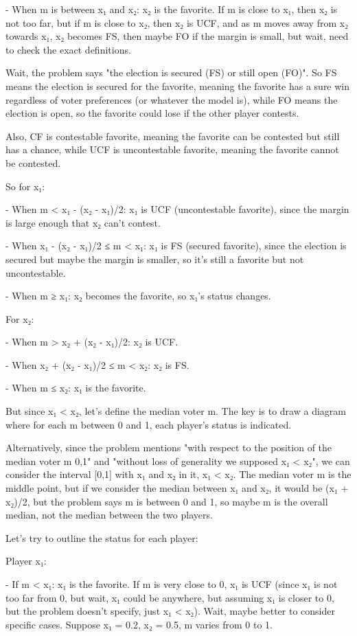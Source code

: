 - When m is between x₁ and x₂: x₂ is the favorite. If m is close to x₁, then x₂ is not too far, but if m is close to x₂, then x₂ is UCF, and as m moves away from x₂ towards x₁, x₂ becomes FS, then maybe FO if the margin is small, but wait, need to check the exact definitions. 

Wait, the problem says "the election is secured (FS) or still open (FO)". So FS means the election is secured for the favorite, meaning the favorite has a sure win regardless of voter preferences (or whatever the model is), while FO means the election is open, so the favorite could lose if the other player contests. 

Also, CF is contestable favorite, meaning the favorite can be contested but still has a chance, while UCF is uncontestable favorite, meaning the favorite cannot be contested. 

So for x₁:

- When m < x₁ - (x₂ - x₁)/2: x₁ is UCF (uncontestable favorite), since the margin is large enough that x₂ can't contest.

- When x₁ - (x₂ - x₁)/2 ≤ m < x₁: x₁ is FS (secured favorite), since the election is secured but maybe the margin is smaller, so it's still a favorite but not uncontestable.

- When m ≥ x₁: x₂ becomes the favorite, so x₁'s status changes.

For x₂:

- When m > x₂ + (x₂ - x₁)/2: x₂ is UCF.

- When x₂ + (x₂ - x₁)/2 ≤ m < x₂: x₂ is FS.

- When m ≤ x₂: x₁ is the favorite.

But since x₁ < x₂, let's define the median voter m. The key is to draw a diagram where for each m between 0 and 1, each player's status is indicated. 

Alternatively, since the problem mentions "with respect to the position of the median voter m 0,1" and "without loss of generality we supposed x₁ < x₂", we can consider the interval [0,1] with x₁ and x₂ in it, x₁ < x₂. The median voter m is the middle point, but if we consider the median between x₁ and x₂, it would be (x₁ + x₂)/2, but the problem says m is between 0 and 1, so maybe m is the overall median, not the median between the two players. 

Let's try to outline the status for each player:

Player x₁:

- If m < x₁: x₁ is the favorite. If m is very close to 0, x₁ is UCF (since x₁ is not too far from 0, but wait, x₁ could be anywhere, but assuming x₁ is closer to 0, but the problem doesn't specify, just x₁ < x₂). Wait, maybe better to consider specific cases. Suppose x₁ = 0.2, x₂ = 0.5, m varies from 0 to 1.

